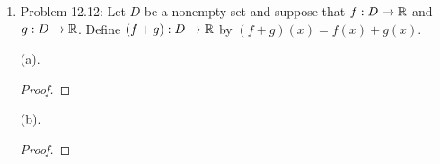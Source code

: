 \documentclass{article}
\begin{document}
\begin{flushleft}
\begin{enumerate}
	\begin{proof}
		($\Rightarrow$)
		
	\end{proof}
	\bigskip
	
	\begin{proof}
		($\Leftarrow$)
		
	\end{proof}

	\item Problem 12.12: Let $D$ be a nonempty set and suppose that $f:D \to \mathbb{R}$ and $g:D \to \mathbb{R}$. Define $(f+g):D \to \mathbb{R}$ by $(f+g)(x) = f(x) + g(x)$.
	
	(a).
	\begin{proof}
		
	\end{proof}
	\bigskip
	
	(b).
	\begin{proof}
		
	\end{proof}
\end{enumerate}

\newpage

\renewcommand{\refname}{Works Cited} %


\end{flushleft}
\end{document}
